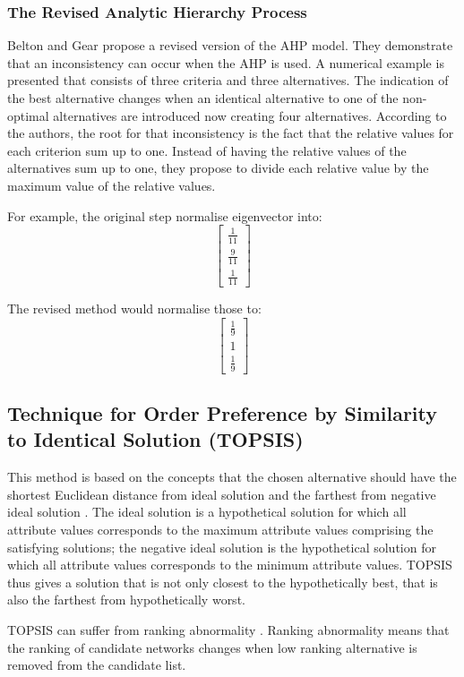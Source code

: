 \subsubsection{The Revised Analytic Hierarchy Process}
Belton and Gear \cite{revisedAHP} propose a revised version
of the AHP model. They demonstrate that an inconsistency can occur when the AHP is used. A numerical example is presented that consists of three criteria and three alternatives. The indication of the best alternative changes when an identical alternative to one of the non-optimal alternatives are introduced now creating four alternatives. According to the authors, the root for that inconsistency is the fact that the relative values for each criterion sum up to one. Instead of having the relative values of the alternatives sum up to one, they propose to divide each relative value by the maximum value of the relative values.

For example, the original step normalise eigenvector into:
$$\begin{bmatrix}
\frac{1}{11} \\
\frac{9}{11} \\
\frac{1}{11}
\end{bmatrix}$$

The revised method would normalise those to:
$$\begin{bmatrix}
\frac{1}{9} \\
1 \\
\frac{1}{9}
\end{bmatrix}$$

\subsection{Technique for Order Preference by Similarity to Identical Solution (TOPSIS)}
This method is based on the concepts that the chosen alternative should have the shortest Euclidean distance from ideal solution and the farthest from negative ideal solution \cite{MCDM}. The ideal solution is a hypothetical solution for which all attribute values corresponds to the maximum attribute values comprising the satisfying solutions; the negative ideal solution is the hypothetical solution for which all attribute values corresponds to the minimum attribute values.
TOPSIS thus gives a solution that is not only closest to the hypothetically best, that is also the farthest from hypothetically worst.

TOPSIS can suffer from ranking abnormality \cite{SAWvsTOPSIS}.
Ranking abnormality means that the ranking of candidate networks changes when low ranking alternative is removed from the candidate list.

